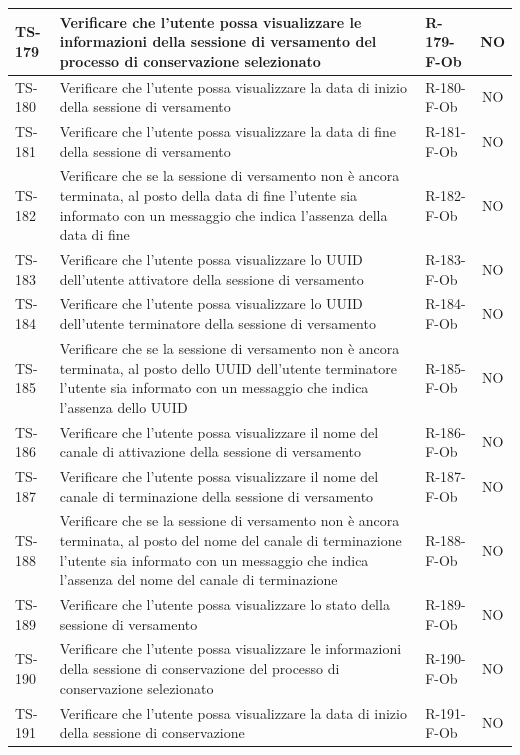 \documentclass[a4paper,12pt]{article}
\begin{document}
\begin{longtable}{|p{1.5cm}|p{8.3cm}|p{2.4cm}|c|}
\hline
TS-179 & Verificare che l'utente possa visualizzare le informazioni della sessione di versamento del processo di conservazione selezionato & R-179-F-Ob & NO \\
\hline
TS-180 & Verificare che l'utente possa visualizzare la data di inizio della sessione di versamento & R-180-F-Ob & NO \\
\hline
TS-181 & Verificare che l'utente possa visualizzare la data di fine della sessione di versamento & R-181-F-Ob & NO \\
\hline
TS-182 & Verificare che se la sessione di versamento non è ancora terminata, al posto della data di fine l'utente sia informato con un messaggio che indica l'assenza della data di fine & R-182-F-Ob & NO \\
\hline
TS-183 & Verificare che l'utente possa visualizzare lo UUID dell'utente attivatore della sessione di versamento & R-183-F-Ob & NO \\
\hline
TS-184 & Verificare che l'utente possa visualizzare lo UUID dell'utente terminatore della sessione di versamento & R-184-F-Ob & NO \\
\hline
TS-185 & Verificare che se la sessione di versamento non è ancora terminata, al posto dello UUID dell'utente terminatore l'utente sia informato con un messaggio che indica l'assenza dello UUID & R-185-F-Ob & NO \\
\hline
TS-186 & Verificare che l'utente possa visualizzare il nome del canale di attivazione della sessione di versamento & R-186-F-Ob & NO \\
\hline
TS-187 & Verificare che l'utente possa visualizzare il nome del canale di terminazione della sessione di versamento & R-187-F-Ob & NO \\
\hline
TS-188 & Verificare che se la sessione di versamento non è ancora terminata, al posto del nome del canale di terminazione l'utente sia informato con un messaggio che indica l'assenza del nome del canale di terminazione & R-188-F-Ob & NO \\
\hline
TS-189 & Verificare che l'utente possa visualizzare lo stato della sessione di versamento & R-189-F-Ob & NO \\
\hline
TS-190 & Verificare che l'utente possa visualizzare le informazioni della sessione di conservazione del processo di conservazione selezionato & R-190-F-Ob & NO \\
\hline
TS-191 & Verificare che l'utente possa visualizzare la data di inizio della sessione di conservazione & R-191-F-Ob & NO \\

\end{longtable}
\end{document}
